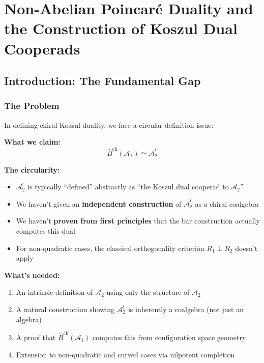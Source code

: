\chapter{Non-Abelian Poincaré Duality and the Construction of Koszul Dual Cooperads}
\label{chap:NAP-koszul-derivation}

\section{Introduction: The Fundamental Gap}

\subsection{The Problem}

\begin{problem}\label{prob:independent-dual}
In defining chiral Koszul duality, we face a circular definition issue:

\textbf{What we claim:}
$$\bar{B}^{\text{ch}}(\mathcal{A}_1) \simeq \mathcal{A}_2^!$$

\textbf{The circularity:}
\begin{itemize}
\item $\mathcal{A}_2^!$ is typically ``defined'' abstractly as ``the Koszul dual cooperad to $\mathcal{A}_2$''
\item We haven't given an \textbf{independent construction} of $\mathcal{A}_2^!$ as a chiral coalgebra
\item We haven't \textbf{proven from first principles} that the bar construction actually computes this dual
\item For non-quadratic cases, the classical orthogonality criterion $R_1 \perp R_2$ doesn't apply
\end{itemize}

\textbf{What's needed:}
\begin{enumerate}
\item An intrinsic definition of $\mathcal{A}_2^!$ using only the structure of $\mathcal{A}_2$
\item A natural construction showing $\mathcal{A}_2^!$ is inherently a coalgebra (not just an algebra)
\item A proof that $\bar{B}^{\text{ch}}(\mathcal{A}_1)$ computes this from configuration space geometry
\item Extension to non-quadratic and curved cases via nilpotent completion
\end{enumerate}
\end{problem}

